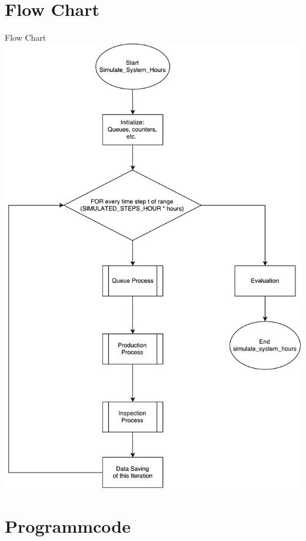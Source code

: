 \section{Flow Chart}
\begin{frame}{Flow Chart}
	\centering
  	\includegraphics[scale=0.25]{BSP22_Flow_Chart.pdf}
\end{frame}

\section{Programmcode}
